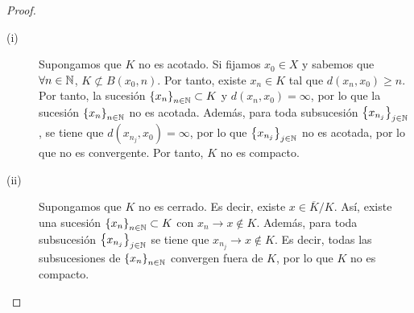 \begin{proof}
\begin{description}
\item[(i)] Supongamos que $\displaystyle K $ no es acotado. Si fijamos $\displaystyle x_{0} \in X $ y sabemos que $\displaystyle \forall n \in \mathbb{N} $, $\displaystyle K \not\subset B\left(x_{0}, n\right) $. Por tanto, existe $\displaystyle x_{n} \in K $ tal que $\displaystyle d\left(x_{n}, x_{0}\right) \geq n $. Por tanto, la sucesión $\displaystyle \left\{ x_{n}\right\} _{n\in\mathbb{N}} \subset K $ y $\displaystyle d\left(x_{n}, x_{0}\right) = \infty $, por lo que la sucesión $\displaystyle \left\{ x_{n}\right\} _{n\in\mathbb{N}} $ no es acotada. 
	Además, para toda subsucesión $\displaystyle \left\{ x_{n_{j}}\right\} _{j \in \mathbb{N}} $, se tiene que $\displaystyle d\left(x_{n_{j}},x_{0}\right) = \infty $, por lo que $\displaystyle \left\{ x_{n_{j}}\right\} _{j \in \mathbb{N}} $ no es acotada, por lo que no es convergente. Por tanto, $\displaystyle K $ no es compacto.
\item[(ii)] Supongamos que $\displaystyle K $ no es cerrado. Es decir, existe $\displaystyle x \in \overline{K}/K $. Así, existe una sucesión $\displaystyle \left\{ x_{n}\right\} _{n\in\mathbb{N}} \subset K $ con $\displaystyle x_{n} \to x \not\in K $. Además, para toda subsucesión $\displaystyle \left\{ x_{n_{j}}\right\} _{j \in \mathbb{N}} $ se tiene que $\displaystyle x_{n_{j}} \to x \not\in K$. Es decir, todas las subsucesiones de $\displaystyle \left\{ x_{n}\right\} _{n\in\mathbb{N}} $ convergen fuera de $\displaystyle K $, por lo que $\displaystyle K $ no es compacto.
\end{description}
\end{proof}

